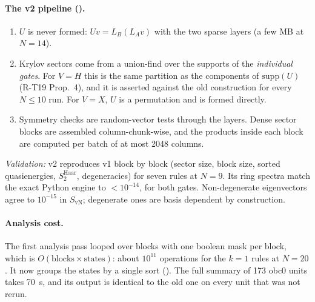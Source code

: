 \paragraph{The v2 pipeline ().}
\begin{enumerate}
\item $U$ is never formed: $Uv=L_B(L_Av)$ with the two sparse layers (a few MB at $N=14$).
\item Krylov sectors come from a union-find over the supports of the \emph{individual gates}. For $V=H$ this is the same
  partition as the components of $\mathrm{supp}(U)$ (R-T19 Prop.~4), and it is asserted against the old construction
  for every $N\le10$ run. For $V=X$, $U$ is a permutation and is formed directly.
\item Symmetry checks are random-vector tests through the layers. Dense sector blocks are assembled column-chunk-wise,
  and the products inside each block are computed per batch of at most 2048 columns.
\end{enumerate}
\emph{Validation:} v2 reproduces v1 block by block (sector size, block size, sorted quasienergies, $S_2^\mathrm{Haar}$,
degeneracies) for seven rules at $N=9$. Its ring spectra match the exact Python engine to $<10^{-14}$, for both gates.
Non-degenerate eigenvectors agree to $10^{-15}$ in $S_\mathrm{vN}$; degenerate ones are basis dependent by construction.

\paragraph{Analysis cost.} The first analysis pass looped over blocks with one boolean mask per block, which is
$O(\text{blocks}\times\text{states})$: about $10^{11}$ operations for the $k=1$ rules at $N=20$. It now groups the
states by a single sort (). The full summary of 173 obc0 units takes 70~s, and its output is identical
to the old one on every unit that was not rerun.
